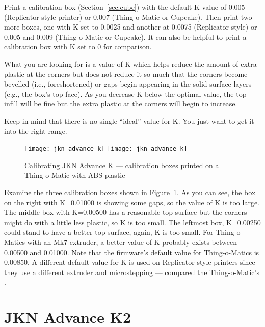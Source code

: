 Print a calibration box (Section~\ref{sec:cube}) with the default K
value of 0.005 (Replicator-style printer) or 0.007 (Thing-o-Matic or
Cupcake). Then print two more boxes, one with K set to 0.0025 and
another at 0.0075 (Replicator-style) or 0.005 and 0.009 (Thing-o-Matic
or Cupcake). It can also be helpful to print a calibration box with K set to 0
for comparison.

What you are looking for is a value of K which helps reduce the amount
of extra plastic at the corners but does not reduce it so much that the
corners become bevelled (i.e., foreshortened) or gaps begin appearing
in the solid surface layers (e.g., the box's top face). As you
decrease K below the optimal value, the top infill will be fine but the
extra plastic at the corners will begin to increase.

Keep in mind that there is no single ``ideal'' value for K. You just want to
get it into the right range.

\begin{figure}[!htbp]
  \centering
    \ifpdf
      \texttt{[image: jkn-advance-k]}
    \else
      \texttt{[image: jkn-advance-k]}
    \fi
    \caption{Calibrating JKN Advance K --- calibration boxes printed on a Thing-o-Matic with ABS plastic}
  \label{fig:jkn-advance-k}
\end{figure}

Examine the three calibration boxes shown in Figure~\ref{fig:jkn-advance-k}.  As you can see, the box
on the right with K=0.01000 is showing some gaps, so the value of K is
too large. The middle box with K=0.00500 has a reasonable top surface but
the corners might do with a little less plastic, so K is too small. The leftmost box, K=0.00250 could stand to have a better top surface, again, K is too small. For Thing-o-Matics with an Mk7 extruder, a better value of
K probably exists between 0.00500 and 0.01000.  Note that the firmware's
default value for Thing-o-Matics is 0.00850.  A different default value for
K is used on Replicator-style printers since they use a different extruder and
{} microstepping --- compared the
Thing-o-Matic's {}.


\section{JKN Advance K2} \label{sec:tuning-k2}

